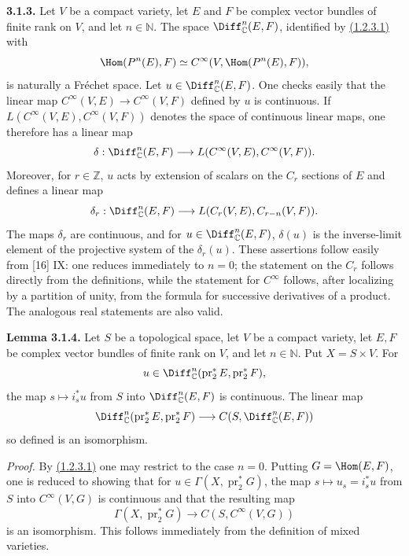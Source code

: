 \textbf{3.1.3.} Let $V$ be a compact variety, let $E$ and $F$ be complex vector bundles of finite rank on $V$, and let $n\in\mathbb N$. The space $\Diff^n_{\mathbb C}(E,F)$, identified by \hyperlink{sga6.e02.eq.1-2-3-1}{(1.2.3.1)} with
\[
 \Hom(P^n(E),F)\simeq C^\infty(V,\Hom(P^n(E),F)),
\]
is naturally a Fréchet space. Let $u\in\Diff^n_{\mathbb C}(E,F)$. One checks easily that the linear map $C^\infty(V,E)\to C^\infty(V,F)$ defined by $u$ is continuous. If $L(C^\infty(V,E),C^\infty(V,F))$ denotes the space of continuous linear maps, one therefore has a linear map
\[
 \delta:\Diff^n_{\mathbb C}(E,F)
 \longrightarrow L(C^\infty(V,E),C^\infty(V,F)).
\]
Moreover, for $r\in\mathbb Z$, $u$ acts by extension of scalars on the $C_r$ sections of $E$ and defines a linear map
\[
 \delta_r:\Diff^n_{\mathbb C}(E,F)
 \longrightarrow L(C_r(V,E),C_{r-n}(V,F)).
\]
The maps $\delta_r$ are continuous, and for $u\in\Diff^n_{\mathbb C}(E,F)$, $\delta(u)$ is the inverse-limit element of the projective system of the $\delta_r(u)$. These assertions follow easily from [16] IX: one reduces immediately to $n=0$; the statement on the $C_r$ follows directly from the definitions, while the statement for $C^\infty$ follows, after localizing by a partition of unity, from the formula for successive derivatives of a product. The analogous real statements are also valid.

\textbf{Lemma 3.1.4.} Let $S$ be a topological space, let $V$ be a compact variety, let $E,F$ be complex vector bundles of finite rank on $V$, and let $n\in\mathbb N$. Put $X=S\times V$. For
\[
 u\in\Diff^n_{\mathbb C}(\operatorname{pr}_2^*E,\operatorname{pr}_2^*F),
\]
the map $s\mapsto i_s^*u$ from $S$ into $\Diff^n_{\mathbb C}(E,F)$ is continuous. The linear map
\[
 \Diff^n_{\mathbb C}(\operatorname{pr}_2^*E,\operatorname{pr}_2^*F)
 \longrightarrow C(S,\Diff^n_{\mathbb C}(E,F))
\]
so defined is an isomorphism.

\emph{Proof.} By \hyperlink{sga6.e02.eq.1-2-3-1}{(1.2.3.1)} one may restrict to the case $n=0$. Putting $G=\Hom(E,F)$, one is reduced to showing that for $u\in\Gamma(X,\operatorname{pr}_2^*G)$, the map $s\mapsto u_s=i_s^*u$ from $S$ into $C^\infty(V,G)$ is continuous and that the resulting map
\[
 \Gamma(X,\operatorname{pr}_2^*G)\longrightarrow C(S,C^\infty(V,G))
\]
is an isomorphism. This follows immediately from the definition of mixed varieties.

